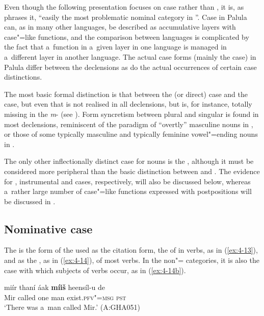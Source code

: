 Even though the following presentation focuses on case  rather than , it is, as \citet[230--231]{masica1991} phrases it, ``easily the most problematic nominal category in \iliNIA''. Case in Palula can, as in many other \iliNIA languages, be described as accumulative  layers with case"=like functions, and the comparison between languages is complicated by the fact that a~function in a~given layer in one language is managed in a~different layer in another language. The actual case forms (mainly the  case) in Palula differ between the declensions as do the actual occurrences of certain case distinctions. 


The most basic formal distinction is that between the  (or direct) case and the  case, but even that is not realised in all declensions, but is, for instance, totally missing in the \textit{m}- (see ). Form syncretism \citep[27]{matthews1991} between  plural and  singular is found in most declensions, reminiscent of the paradigm of ``overtly'' masculine nouns in \iliUrduHindi \citep[1]{schmidt1999}, or those of some typically masculine and typically feminine vowel"=ending nouns in \iliPashto \citep[726-728]{robsontegey2009}.


The only other inflectionally distinct case for nouns is the , although it must be considered more peripheral than the basic distinction between  and . The evidence for , instrumental and  cases, respectively, will also be discussed below, whereas a~rather large number of case"=like functions expressed with postpositions will be discussed in .


\subsection{Nominative case}
\label{subsec:4-5-1}

The  is the form of the  used as the citation form, the  of in verbs, as in (\ref{ex:4-13}), and as the , as in (\ref{ex:4-14}), of most  verbs. In the non"= categories, it is also the case with which subjects of  verbs occur, as in (\ref{ex:4-14b}). 


\begin{exe}
\ex
\label{ex:4-13}
\gll miír thaní áak \textbf{míiš} heensíl-u de\\
	Mir called one man exist.\textsc{pfv"=msg} \textsc{pst}\\
\glt `There was a~man called Mir.' (A:GHA051)
\end{exe}

